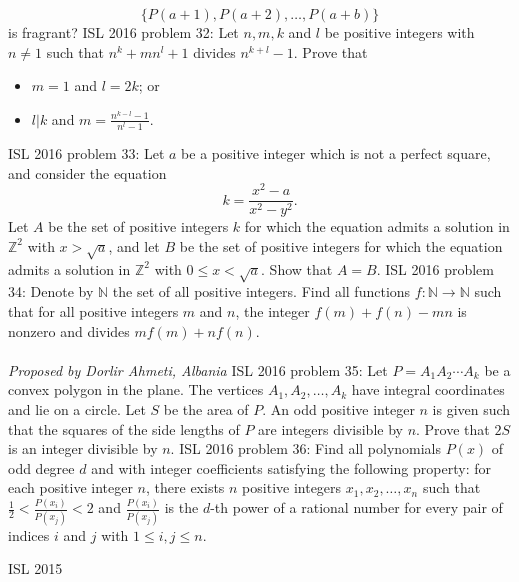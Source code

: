 \[ \{P(a+1),P(a+2),\ldots,P(a+b)\} \]
is fragrant? 
ISL 2016 problem 32:  Let $n, m, k$ and $l$ be positive integers with $n \neq 1$ such that $n^k + mn^l + 1$ divides $n^{k+l} - 1$. Prove that
\begin{itemize}
  \item $m = 1$ and $l = 2k$; or
  \item $l|k$ and $m = \frac{n^{k-l}-1}{n^l-1}$.
\end{itemize} 
ISL 2016 problem 33:  Let $a$ be a positive integer which is not a perfect square, and consider the equation
\[ k = \frac{x^2-a}{x^2-y^2}. \]
Let $A$ be the set of positive integers $k$ for which the equation admits a solution in $\mathbb Z^2$ with $x>\sqrt{a}$, and let $B$ be the set of positive integers for which the equation admits a solution in $\mathbb Z^2$ with $0\leq x<\sqrt{a}$. Show that $A=B$. 
ISL 2016 problem 34:  Denote by $\mathbb{N}$ the set of all positive integers. Find all functions $f:\mathbb{N}\rightarrow \mathbb{N}$ such that for all positive integers $m$ and $n$, the integer $f(m)+f(n)-mn$ is nonzero and divides $mf(m)+nf(n)$. \\\\
\textit{Proposed by Dorlir Ahmeti, Albania} 
ISL 2016 problem 35:  Let $P=A_1A_2\cdots A_k$ be a convex polygon in the plane. The vertices $A_1, A_2, \ldots, A_k$ have integral coordinates and lie on a circle. Let $S$ be the area of $P$. An odd positive integer $n$ is given such that the squares of the side lengths of $P$ are integers divisible by $n$. Prove that $2S$ is an integer divisible by $n$. 
ISL 2016 problem 36:  Find all polynomials $P(x)$ of odd degree $d$ and with integer coefficients satisfying the following property: for each positive integer $n$, there exists $n$ positive integers $x_1, x_2, \ldots, x_n$ such that $\frac12 < \frac{P(x_i)}{P(x_j)} < 2$ and $\frac{P(x_i)}{P(x_j)}$ is the $d$-th power of a rational number for every pair of indices $i$ and $j$ with $1 \leq i, j \leq n$. 

ISL 2015 

